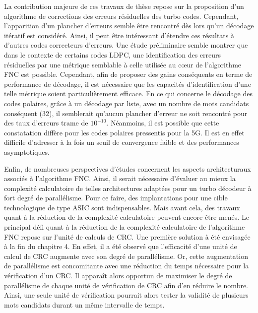 La contribution majeure de ces travaux de thèse repose sur la proposition d'un algorithme de corrections des erreurs 
résiduelles des turbo codes. Cependant, l'apparition d'un plancher d'erreurs semble être rencontré dès lors qu'un 
décodage itératif est considéré. Ainsi, il peut être intéressant d'étendre ces résultats à
d'autres codes correcteurs d'erreurs. Une étude préliminaire semble montrer que dans le 
contexte de certains codes LDPC, une identification des erreurs résiduelles par une métrique semblable à celle 
utilisée au cœur de l'algorithme FNC est possible. Cependant, afin de proposer des gains conséquents en terme de performance de 
décodage, il est nécessaire que les capacités d'identification d'une telle métrique soient particulièrement
efficace. En ce qui concerne le décodage des codes polaires, grâce à un décodage par liste, avec un nombre de mots
candidats conséquent (32), il semblerait qu'aucun plancher d'erreur ne soit rencontré pour des taux d'erreurs trame de 
$10^{-10}$. Néanmoins, il est possible que cette constatation diffère pour les codes polaires pressentis pour la 5G. Il est 
en effet difficile d'adresser à la fois un seuil de convergence faible et des performances asymptotiques.


Enfin, de nombreuses perspectives d'études concernent les aspects architecturaux associés à l'algorithme
FNC. Ainsi, il serait nécessaire d'évaluer au mieux la complexité calculatoire de telles architectures adaptées pour un turbo
décodeur à fort degré de parallélisme. Pour ce faire, des implantations pour une cible technologique de type ASIC sont 
indispensables. Mais avant cela, des travaux quant à la réduction de la complexité calculatoire peuvent encore être
menés. Le principal défi quant à la réduction de la complexité calculatoire de l'algorithme FNC repose sur l'unité de
calculs de CRC. Une première solution à été envisagée à la fin du chapitre 4. En effet, il a été observé que l'efficacité
d'une unité de calcul de CRC augmente avec son degré de parallélisme. Or, cette augmentation de parallélisme est 
concomitante avec une réduction du temps nécessaire pour la vérification d'un CRC. Il apparaît alors opportun de maximiser
le degré de parallélisme de chaque unité de vérification de CRC afin d'en réduire le nombre. Ainsi, une 
seule unité de vérification pourrait alors tester la validité de plusieurs mots candidats durant un même intervalle de temps.

